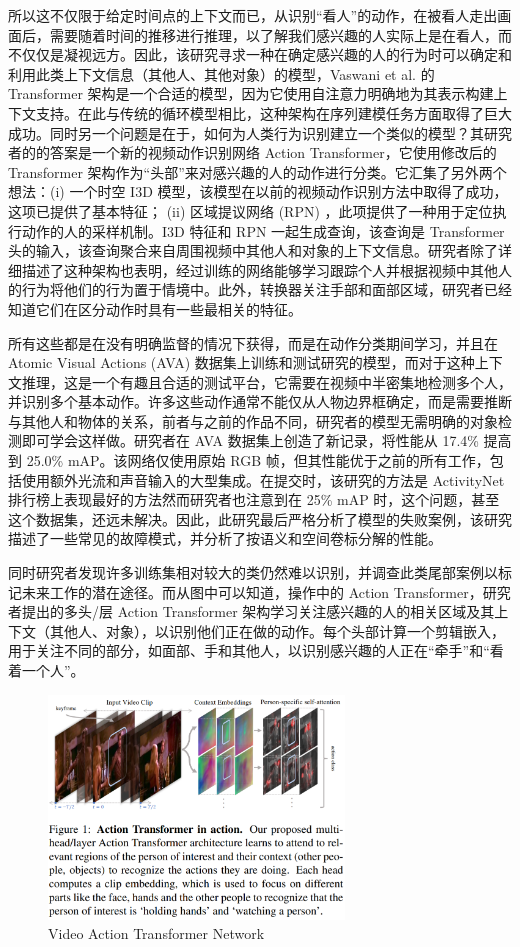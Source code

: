 所以这不仅限于给定时间点的上下文而已，从识别“看人”的动作，在被看人走出画面后，需要随着时间的推移进行推理，以了解我们感兴趣的人实际上是在看人，而不仅仅是凝视远方。因此，该研究寻求一种在确定感兴趣的人的行为时可以确定和利用此类上下文信息（其他人、其他对象）的模型，Vaswani et al. 的 Transformer 架构是一个合适的模型，因为它使用自注意力明确地为其表示构建上下文支持。在此与传统的循环模型相比，这种架构在序列建模任务方面取得了巨大成功。同时另一个问题是在于，如何为人类行为识别建立一个类似的模型？其研究者的的答案是一个新的视频动作识别网络 Action Transformer，它使用修改后的 Transformer 架构作为“头部”来对感兴趣的人的动作进行分类。它汇集了另外两个想法：(i) 一个时空 I3D 模型，该模型在以前的视频动作识别方法中取得了成功，这项已提供了基本特征； (ii) 区域提议网络 (RPN) ，此项提供了一种用于定位执行动作的人的采样机制。I3D 特征和 RPN 一起生成查询，该查询是 Transformer 头的输入，该查询聚合来自周围视频中其他人和对象的上下文信息。研究者除了详细描述了这种架构也表明，经过训练的网络能够学习跟踪个人并根据视频中其他人的行为将他们的行为置于情境中。此外，转换器关注手部和面部区域，研究者已经知道它们在区分动作时具有一些最相关的特征。

所有这些都是在没有明确监督的情况下获得，而是在动作分类期间学习，并且在 Atomic Visual Actions (AVA) 数据集上训练和测试研究的模型，而对于这种上下文推理，这是一个有趣且合适的测试平台，它需要在视频中半密集地检测多个人，并识别多个基本动作。许多这些动作通常不能仅从人物边界框确定，而是需要推断与其他人和物体的关系，前者与之前的作品不同，研究者的模型无需明确的对象检测即可学会这样做。研究者在 AVA 数据集上创造了新记录，将性能从 17.4\% 提高到 25.0\% mAP。该网络仅使用原始 RGB 帧，但其性能优于之前的所有工作，包括使用额外光流和声音输入的大型集成。在提交时，该研究的方法是 ActivityNet 排行榜上表现最好的方法然而研究者也注意到在 25\% mAP 时，这个问题，甚至这个数据集，还远未解决。因此，此研究最后严格分析了模型的失败案例，该研究描述了一些常见的故障模式，并分析了按语义和空间卷标分解的性能。

同时研究者发现许多训练集相对较大的类仍然难以识别，并调查此类尾部案例以标记未来工作的潜在途径。而从图中可以知道，操作中的 Action Transformer，研究者提出的多头/层 Action Transformer 架构学习关注感兴趣的人的相关区域及其上下文（其他人、对象），以识别他们正在做的动作。每个头部计算一个剪辑嵌入，用于关注不同的部分，如面部、手和其他人，以识别感兴趣的人正在“牵手”和“看着一个人”。

\begin{figure}[htb]
\centering 
\includegraphics[width=0.7\textwidth]{img/pa6.png} 
\caption{Video Action Transformer Network}
\label{Test}
\end{figure}

